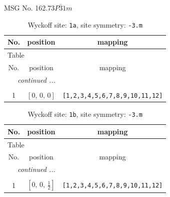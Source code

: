 \documentclass[fleqn,8pt]{jsarticle}
\begin{document}
\setcounter{MaxMatrixCols}{32}

\renewcommand{\tablename}{Table~}
\renewcommand{\figurename}{Figure~}
\begin{center}
\LARGE
MSG No. 162.73\quad$P\bar{3}1m$
\end{center}
\renewcommand{\arraystretch}{1.2}
\begin{longtable}{ccc}
\caption{Wyckoff site: {\tt 1a}, site symmetry: {\tt -3.m}}
 \\
 \hline \hline
No. & position & mapping \\ \hline \endfirsthead

\multicolumn{2}{l}{\tablename\ \thetable{}} \\
 \hline \hline
No. & position & mapping \\ \hline \endhead

 \hline \hline
\multicolumn{2}{r}{\footnotesize\it continued ...} \\ \endfoot

 \hline \hline
\multicolumn{2}{r}{} \\ \endlastfoot

1 & $\left[ 0,\, 0,\, 0 \right]$ & {\tt [1,2,3,4,5,6,7,8,9,10,11,12]} \\
\end{longtable}
\renewcommand{\arraystretch}{1.2}
\begin{longtable}{ccc}
\caption{Wyckoff site: {\tt 1b}, site symmetry: {\tt -3.m}}
 \\
 \hline \hline
No. & position & mapping \\ \hline \endfirsthead

\multicolumn{2}{l}{\tablename\ \thetable{}} \\
 \hline \hline
No. & position & mapping \\ \hline \endhead

 \hline \hline
\multicolumn{2}{r}{\footnotesize\it continued ...} \\ \endfoot

 \hline \hline
\multicolumn{2}{r}{} \\ \endlastfoot

1 & $\left[ 0,\, 0,\, \frac{1}{2} \right]$ & {\tt [1,2,3,4,5,6,7,8,9,10,11,12]} \\
\end{longtable}
\renewcommand{\arraystretch}{1.2}
\end{document}
